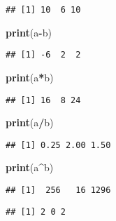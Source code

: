 \documentclass[]{book}
\newenvironment{Shaded}{\begin{snugshade}}{\end{snugshade}}
\newcommand{\KeywordTok}[1]{\textcolor[rgb]{0.13,0.29,0.53}{\textbf{#1}}}
\newcommand{\OperatorTok}[1]{\textcolor[rgb]{0.81,0.36,0.00}{\textbf{#1}}}
\newcommand{\NormalTok}[1]{#1}
\theoremstyle{definition}
\theoremstyle{definition}
\theoremstyle{definition}
\theoremstyle{remark}
\begin{document}
\begin{verbatim}
## [1] 10  6 10
\end{verbatim}

\begin{Shaded}
\begin{Highlighting}[]
\KeywordTok{print}\NormalTok{(a}\OperatorTok{-}\NormalTok{b)}
\end{Highlighting}
\end{Shaded}

\begin{verbatim}
## [1] -6  2  2
\end{verbatim}

\begin{Shaded}
\begin{Highlighting}[]
\KeywordTok{print}\NormalTok{(a}\OperatorTok{*}\NormalTok{b)}
\end{Highlighting}
\end{Shaded}

\begin{verbatim}
## [1] 16  8 24
\end{verbatim}

\begin{Shaded}
\begin{Highlighting}[]
\KeywordTok{print}\NormalTok{(a}\OperatorTok{/}\NormalTok{b)}
\end{Highlighting}
\end{Shaded}

\begin{verbatim}
## [1] 0.25 2.00 1.50
\end{verbatim}

\begin{Shaded}
\begin{Highlighting}[]
\KeywordTok{print}\NormalTok{(a}\OperatorTok{^}\NormalTok{b)}
\end{Highlighting}
\end{Shaded}

\begin{verbatim}
## [1]  256   16 1296
\end{verbatim}

\begin{Shaded}
\end{Shaded}

\begin{verbatim}
## [1] 2 0 2
\end{verbatim}
\end{document}
